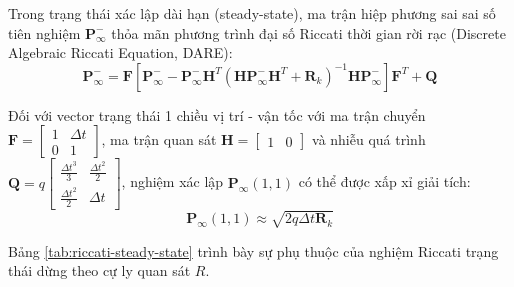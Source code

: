 \hspace{0.5cm} Trong trạng thái xác lập dài hạn (steady-state), ma trận hiệp phương sai sai số tiên nghiệm $\mathbf{P}_{\infty}^-$ thỏa mãn phương trình đại số Riccati thời gian rời rạc (Discrete Algebraic Riccati Equation, DARE):
\begin{equation}
\mathbf{P}_{\infty}^- = \mathbf{F} \left[ \mathbf{P}_{\infty}^- - \mathbf{P}_{\infty}^- \mathbf{H}^T \left(\mathbf{H} \mathbf{P}_{\infty}^- \mathbf{H}^T + \mathbf{R}_k\right)^{-1} \mathbf{H} \mathbf{P}_{\infty}^- \right] \mathbf{F}^T + \mathbf{Q}
\label{eq:discrete-riccati-equation}
\end{equation}

Đối với vector trạng thái 1 chiều vị trí - vận tốc với ma trận chuyển $\mathbf{F} = \begin{bmatrix} 1 & \Delta t \\ 0 & 1 \end{bmatrix}$, ma trận quan sát $\mathbf{H} = \begin{bmatrix} 1 & 0 \end{bmatrix}$ và nhiễu quá trình $\mathbf{Q} = q \begin{bmatrix} \frac{\Delta t^3}{3} & \frac{\Delta t^2}{2} \\ \frac{\Delta t^2}{2} & \Delta t \end{bmatrix}$, nghiệm xác lập $\mathbf{P}_{\infty}(1,1)$ có thể được xấp xỉ giải tích:
\begin{equation}
\mathbf{P}_{\infty}(1,1) \approx \sqrt{2 q \Delta t \mathbf{R}_k}
\label{eq:riccati-analytical-approx}
\end{equation}

Bảng \ref{tab:riccati-steady-state} trình bày sự phụ thuộc của nghiệm Riccati trạng thái dừng theo cự ly quan sát $R$.

\begin{table}[H]
\centering
\caption{Nghiệm xác lập Riccati $\mathbf{P}_{\infty}$ và bán kính bất định theo cự ly quan sát}
\label{tab:riccati-steady-state}
\end{table}


